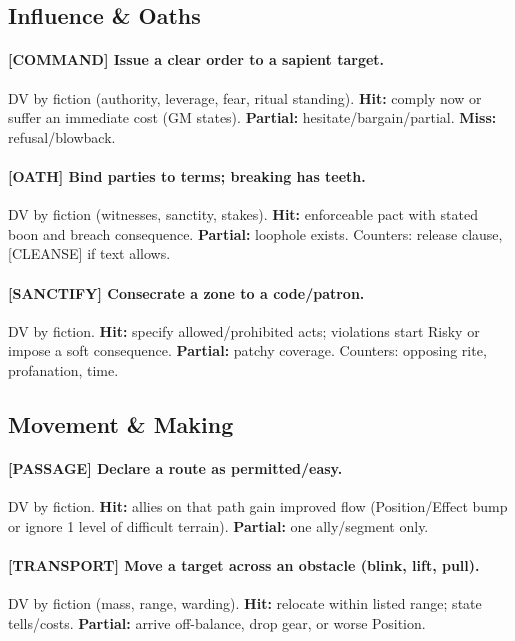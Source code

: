 \subsection{Influence \& Oaths}
\paragraph{[COMMAND] Issue a clear order to a sapient target.}
DV by fiction (authority, leverage, fear, ritual standing). \textbf{Hit:} comply now or suffer an immediate cost (GM states). \textbf{Partial:} hesitate/bargain/partial. \textbf{Miss:} refusal/blowback.

\paragraph{[OATH] Bind parties to terms; breaking has teeth.}
DV by fiction (witnesses, sanctity, stakes). \textbf{Hit:} enforceable pact with stated boon and breach consequence. \textbf{Partial:} loophole exists. 
Counters: release clause, [CLEANSE] if text allows.

\paragraph{[SANCTIFY] Consecrate a zone to a code/patron.}
DV by fiction. \textbf{Hit:} specify allowed/prohibited acts; violations start Risky or impose a soft consequence. \textbf{Partial:} patchy coverage. 
Counters: opposing rite, profanation, time.

\subsection{Movement \& Making}
\paragraph{[PASSAGE] Declare a route as permitted/easy.}
DV by fiction. \textbf{Hit:} allies on that path gain improved flow (Position/Effect bump or ignore 1 level of difficult terrain). \textbf{Partial:} one ally/segment only.

\paragraph{[TRANSPORT] Move a target across an obstacle (blink, lift, pull).}
DV by fiction (mass, range, warding). \textbf{Hit:} relocate within listed range; state tells/costs. \textbf{Partial:} arrive off-balance, drop gear, or worse Position.

